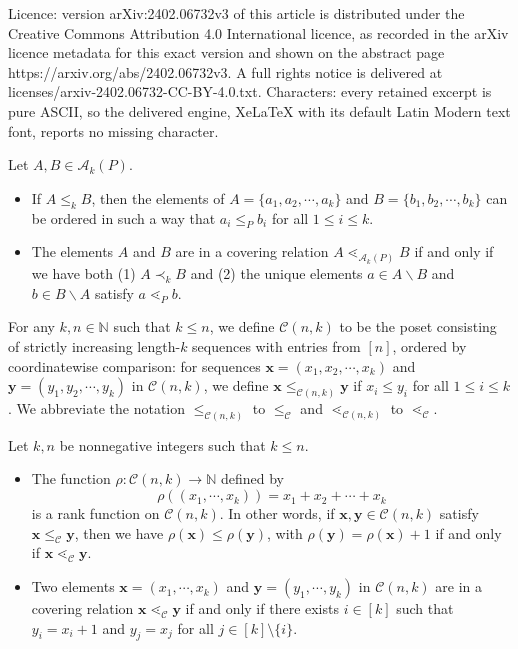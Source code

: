 \documentclass[10pt,a4paper]{amsart}
\newcommand{\N}{\mathbb{N}}
\newcommand{\akp}{\mathcal{A}_k(P)}
\newcommand{\bfx}{\mathbf{x}}
\newcommand{\bfy}{\mathbf{y}}
\newcommand{\cala}{\mathcal{A}}
\newcommand{\calc}{\mathcal{C}}
\begin{document}
Licence: version arXiv:2402.06732v3 of this article is distributed under the Creative Commons Attribution 4.0 International licence, as recorded in the arXiv licence metadata for this exact version and shown on the abstract page https://arxiv.org/abs/2402.06732v3. A full rights notice is delivered at licenses/arxiv-2402.06732-CC-BY-4.0.txt. Characters: every retained excerpt is pure ASCII, so the delivered engine, XeLaTeX with its default Latin Modern text font, reports no missing character.
\begin{proposition}\label{prop:basics}
Let $A,B\in \akp$. 
\begin{itemize} 
\item [(i)]  If $A \leq_k B$, then the elements of $A = \{a_1, a_2, \cdots,
     a_k\}$ and $B = \{b_1, b_2, \cdots, b_k\}$ can be ordered in such a way
     that $a_i \leq_P b_i$ for all $1 \leq i \leq k$.
 \item [(ii)] The elements $A$ and $B$ are in a covering relation
      $A\lessdot_{\cala_k(P)} B$ if and only if we have both (1) $A \prec_k B$
      and (2) the unique elements $a \in A \backslash B$ and $b \in B \backslash
      A$ satisfy $a \lessdot_P b$.
\end{itemize}
\end{proposition}

\begin{definition}\label{def:cak}
For any $k,n\in \N$ such that $k \leq n$, we define $\calc(n,k)$ to be the poset
consisting of strictly increasing length-$k$ sequences with entries from $[n]$,
ordered by coordinatewise comparison: for sequences $\bfx = (x_1, x_2, \cdots,
x_k)$ and $\bfy = (y_1, y_2, \cdots, y_k)$ in $\calc(n, k)$, we define
$\bfx\le_{\calc(n,k)} \bfy$ if $x_i\le y_i$ for all $1\le i\le k$.  We
abbreviate the notation $\le_{\calc(n,k)}$ to $\le_\calc$ and
$\lessdot_{\calc(n,k)}$ to $\lessdot_\calc$.
\end{definition}

\begin{lemma}\label{lem:cak} 
Let $k,n$ be nonnegative integers such that $k \leq n$. 
\begin{itemize}
\item[{\rm (i)}] 
The function $\rho : \calc(n, k) \rightarrow \N$ defined by 
\[
    \rho( (x_1,\cdots,x_k)) = x_1 + x_2 + \cdots + x_k
\]
is a rank function on $\calc(n,k)$.  In other words, if $\bfx, \bfy \in \calc(n,
k)$ satisfy $\bfx \leq_\calc \bfy$, then we have $\rho(\bfx) \leq \rho(\bfy)$,
with $\rho(\bfy) = \rho(\bfx) + 1$ if and only if $\bfx \lessdot_{\calc} \bfy$.

\item[{\rm (ii)}]
Two elements $\bfx=(x_1,\cdots,x_k)$ and $\bfy=(y_1,\cdots, y_k)$  in $\calc(n,
k)$  are in a covering relation $\bfx\lessdot_\calc \bfy$ if and only if there
exists $i\in [k]$ such that $y_i=x_i+1$ and $y_j=x_j$ for all $j\in
[k]\setminus\{i\}$.
\end{itemize}
\end{lemma}
\end{document}
